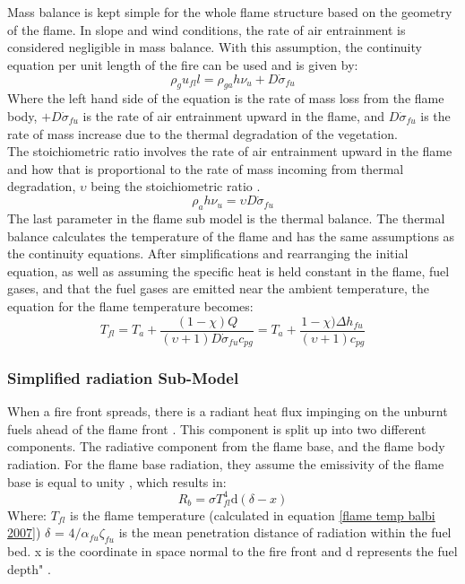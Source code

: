 \documentclass{article}
\begin{document}
\indent Mass balance is kept simple for the whole flame structure based on the geometry of the flame. In slope and wind conditions, the rate of air entrainment is considered negligible in mass balance. With this assumption, the continuity equation per unit length of the fire can be used and is given by:
\begin{equation}
	\label{mass balance balbi}
	\rho_g u_{fl}l = \rho_{ga} h \nu _u + D \dot{\sigma} _ {fu}
\end{equation}
Where the left hand side of the equation is the rate of mass loss from the flame body, $ + D \dot{\sigma} _ {fu}$ is the rate of air entrainment upward in the flame, and $D \dot{\sigma} _ {fu}$ is the rate of mass increase due to the thermal degradation of the vegetation. \\
\indent The stoichiometric ratio involves the rate of air entrainment upward in the flame and how that is proportional to the rate of mass incoming from thermal degradation, $\upsilon$ being the stoichiometric ratio \citep{Balbi2007}. 
\begin{equation}
	\label{stoich ratio}
	\rho _ a h \nu _ u = \upsilon D \dot{\sigma} _ {fu}
\end{equation}
\indent The last parameter in the flame sub model is the thermal balance. The thermal balance calculates the temperature of the flame and has the same assumptions as the continuity equations. After simplifications and rearranging the initial equation, as well as assuming the specific heat is held constant in the flame, fuel gases, and that the fuel gases are emitted near the ambient temperature, the equation for the flame temperature becomes:
\begin{equation}
	\label{flame temp balbi 2007}
	T_{fl} = T_a + \frac {(1 - \chi) Q}{(\upsilon + 1) D \dot{\sigma} _ {fu} c_{pg}} = T_a + \frac {1 - \chi) \Delta h _ {fu} }{(\upsilon + 1) c_{pg}}
\end{equation}
\subsubsection{Simplified radiation Sub-Model}
\indent When a fire front spreads, there is a radiant heat flux impinging on the unburnt fuels ahead of the flame front \citep{Balbi2007}. This component is split up into two different components. The radiative component from the flame base, and the flame body radiation. For the flame base radiation, they assume the emissivity of the flame base is equal to unity \citep{Balbi2007}, which results in:
\begin{equation}
	\label{R_b 2007}
	R_b = \sigma T^{4}_{fl} \mathrm{d}(\delta - x)
\end{equation}
Where: $T_{fl}$ is the flame temperature (calculated in equation \ref{flame temp balbi 2007}) $\delta$ = $4/ \alpha _{fu} \zeta _ {fu}$ is the mean penetration distance of radiation within the fuel bed. x is the coordinate in space normal to the fire front and d represents the fuel depth" \citep{Balbi2007}. \\
\end{document}
